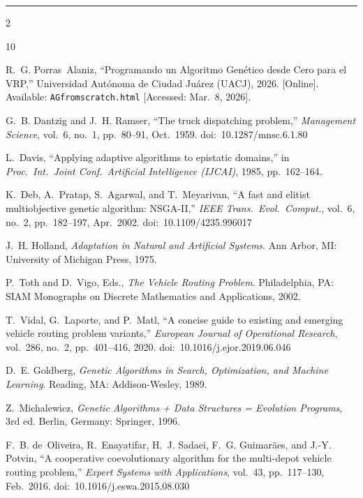 \documentclass[12pt,letterpaper]{article}
\begin{document}
\vspace{1.5em}
{\color{uacjgray}\hrule}
\vspace{1em}

\newpage

\begin{multicols}{2}
\small
\begin{thebibliography}{10}

R.~G. Porras~Alaniz, ``Programando un Algoritmo Genético desde Cero para el VRP,''
Universidad Autónoma de Ciudad Juárez (UACJ), 2026. [Online].
Available: \texttt{AGfromscratch.html} [Accessed: Mar.\ 8, 2026].

G.~B. Dantzig and J.~H. Ramser, ``The truck dispatching problem,''
\textit{Management Science}, vol.~6, no.~1, pp.~80--91, Oct.~1959.
doi:~10.1287/mnsc.6.1.80

L.~Davis, ``Applying adaptive algorithms to epistatic domains,''
in \textit{Proc.\ Int.\ Joint Conf.\ Artificial Intelligence (IJCAI)},
1985, pp.~162--164.

K.~Deb, A.~Pratap, S.~Agarwal, and T.~Meyarivan, ``A fast and elitist
multiobjective genetic algorithm: NSGA-II,'' \textit{IEEE Trans.\ Evol.\
Comput.}, vol.~6, no.~2, pp.~182--197, Apr.~2002.
doi:~10.1109/4235.996017

J.~H. Holland, \textit{Adaptation in Natural and Artificial Systems}.
Ann Arbor, MI: University of Michigan Press, 1975.

P.~Toth and D.~Vigo, Eds., \textit{The Vehicle Routing Problem}.
Philadelphia, PA: SIAM Monographs on Discrete Mathematics and
Applications, 2002.

T.~Vidal, G.~Laporte, and P.~Matl, ``A concise guide to existing and
emerging vehicle routing problem variants,'' \textit{European Journal of
Operational Research}, vol.~286, no.~2, pp.~401--416, 2020.
doi:~10.1016/j.ejor.2019.06.046

D.~E. Goldberg, \textit{Genetic Algorithms in Search, Optimization,
and Machine Learning}. Reading, MA: Addison-Wesley, 1989.

Z.~Michalewicz, \textit{Genetic Algorithms + Data Structures = Evolution
Programs}, 3rd ed. Berlin, Germany: Springer, 1996.

F.~B. de~Oliveira, R.~Enayatifar, H.~J. Sadaei, F.~G. Guimarães, and
J.-Y. Potvin, ``A cooperative coevolutionary algorithm for the
multi-depot vehicle routing problem,'' \textit{Expert Systems with
Applications}, vol.~43, pp.~117--130, Feb.~2016.
doi:~10.1016/j.eswa.2015.08.030

\end{thebibliography}
\end{multicols}
\end{document}
